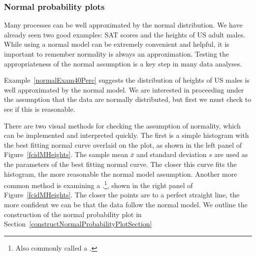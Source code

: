 
\subsubsection{Normal probability plots}



Many processes can be well approximated by the normal distribution. We have already seen two good examples: SAT scores and the heights of US adult males. While using a normal model can be extremely convenient and helpful, it is important to remember normality is always an approximation. Testing the appropriateness of the normal assumption is a key step in many data analyses.



Example~\ref{normalExam40Perc} suggests the distribution of heights of US males is well approximated by the normal model. We are interested in proceeding under the assumption that the data are normally distributed, but first we must check to see if this is reasonable.

There are two visual methods for checking the assumption of normality, which can be implemented and interpreted quickly. The first is a simple histogram with the best fitting normal curve overlaid on the plot, as shown in the left panel of Figure~\ref{fcidMHeights}. The sample mean $\bar{x}$ and standard deviation $s$ are used as the parameters of the best fitting normal curve. The closer this curve fits the histogram, the more reasonable the normal model assumption. Another more common method is examining a .\footnote{Also commonly called a .}, shown in the right panel of Figure~\ref{fcidMHeights}. The closer the points are to a perfect straight line, the more confident we can be that the data follow the normal model. We outline the construction of the normal probability plot in Section~\ref{constructNormalProbabilityPlotSection}

